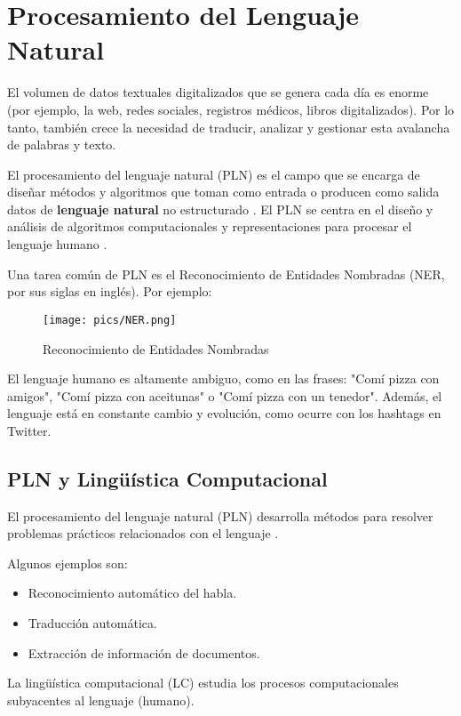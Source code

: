 \documentclass{book}
\begin{document}
\chapter{Procesamiento del Lenguaje Natural}

El volumen de datos textuales digitalizados que se genera cada día es enorme (por ejemplo, la web, redes sociales, registros médicos, libros digitalizados). Por lo tanto, también crece la necesidad de traducir, analizar y gestionar esta avalancha de palabras y texto.

El procesamiento del lenguaje natural (PLN) es el campo que se encarga de diseñar métodos y algoritmos que toman como entrada o producen como salida datos de \textbf{lenguaje natural} no estructurado \cite{goldberg2017neural}. El PLN se centra en el diseño y análisis de algoritmos computacionales y representaciones para procesar el lenguaje humano \cite{jacobbook}.



Una tarea común de PLN es el Reconocimiento de Entidades Nombradas (NER, por sus siglas en inglés). Por ejemplo:

\begin{figure}[h]
	\texttt{[image: pics/NER.png]}
	\caption{Reconocimiento de Entidades Nombradas}
\end{figure}

El lenguaje humano es altamente ambiguo, como en las frases: "Comí pizza con amigos", "Comí pizza con aceitunas" o "Comí pizza con un tenedor". Además, el lenguaje está en constante cambio y evolución, como ocurre con los hashtags en Twitter.

\section{PLN y Lingüística Computacional}

El procesamiento del lenguaje natural (PLN) desarrolla métodos para resolver problemas prácticos relacionados con el lenguaje \cite{JohnsonMLSS}.

Algunos ejemplos son:

\begin{itemize}
  \item Reconocimiento automático del habla.
  \item Traducción automática.
  \item Extracción de información de documentos.
\end{itemize}

La lingüística computacional (LC) estudia los procesos computacionales subyacentes al lenguaje (humano).
\end{document}
